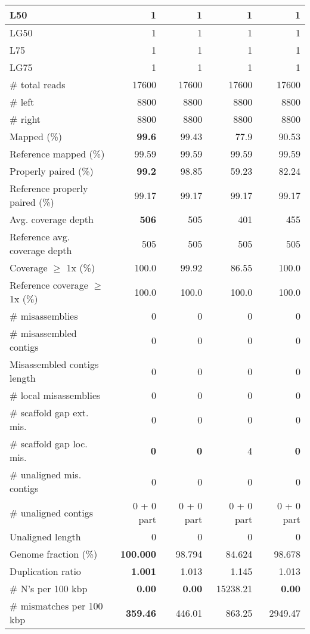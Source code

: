 \documentclass[12pt,a4paper]{article}
\begin{document}
\begin{table}[ht]
\begin{center}
\begin{tabular}{|l*{4}{|r}|}
L50 & 1 & 1 & 1 & 1 \\ \hline
LG50 & 1 & 1 & 1 & 1 \\ \hline
L75 & 1 & 1 & 1 & 1 \\ \hline
LG75 & 1 & 1 & 1 & 1 \\ \hline
\# total reads & 17600 & 17600 & 17600 & 17600 \\ \hline
\# left & 8800 & 8800 & 8800 & 8800 \\ \hline
\# right & 8800 & 8800 & 8800 & 8800 \\ \hline
Mapped (\%) & {\bf 99.6} & 99.43 & 77.9 & 90.53 \\ \hline
Reference mapped (\%) & 99.59 & 99.59 & 99.59 & 99.59 \\ \hline
Properly paired (\%) & {\bf 99.2} & 98.85 & 59.23 & 82.24 \\ \hline
Reference properly paired (\%) & 99.17 & 99.17 & 99.17 & 99.17 \\ \hline
Avg. coverage depth & {\bf 506} & 505 & 401 & 455 \\ \hline
Reference avg. coverage depth & 505 & 505 & 505 & 505 \\ \hline
Coverage $\geq$ 1x (\%) & 100.0 & 99.92 & 86.55 & 100.0 \\ \hline
Reference coverage $\geq$ 1x (\%) & 100.0 & 100.0 & 100.0 & 100.0 \\ \hline
\# misassemblies & 0 & 0 & 0 & 0 \\ \hline
\# misassembled contigs & 0 & 0 & 0 & 0 \\ \hline
Misassembled contigs length & 0 & 0 & 0 & 0 \\ \hline
\# local misassemblies & 0 & 0 & 0 & 0 \\ \hline
\# scaffold gap ext. mis. & 0 & 0 & 0 & 0 \\ \hline
\# scaffold gap loc. mis. & {\bf 0} & {\bf 0} & 4 & {\bf 0} \\ \hline
\# unaligned mis. contigs & 0 & 0 & 0 & 0 \\ \hline
\# unaligned contigs & 0 + 0 part & 0 + 0 part & 0 + 0 part & 0 + 0 part \\ \hline
Unaligned length & 0 & 0 & 0 & 0 \\ \hline
Genome fraction (\%) & {\bf 100.000} & 98.794 & 84.624 & 98.678 \\ \hline
Duplication ratio & {\bf 1.001} & 1.013 & 1.145 & 1.013 \\ \hline
\# N's per 100 kbp & {\bf 0.00} & {\bf 0.00} & 15238.21 & {\bf 0.00} \\ \hline
\# mismatches per 100 kbp & {\bf 359.46} & 446.01 & 863.25 & 2949.47 \\ \hline

\end{tabular}
\end{center}
\end{table}
\end{document}
